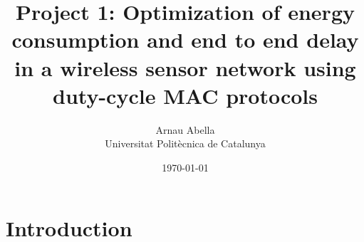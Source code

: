\documentclass[12pt, a4paper]{article}
\title{%
  \vspace{-10ex}
  Project 1: Optimization of energy consumption and end to end delay in a wireless sensor network using duty-cycle MAC protocols
}
\author{%
  Arnau Abella \\
  \large{Universitat Polit\`ecnica de Catalunya}
}
\date{\today}
\begin{document}
\maketitle

\section{Introduction}
\label{sec:introduction}


% 
% 
\end{document}
